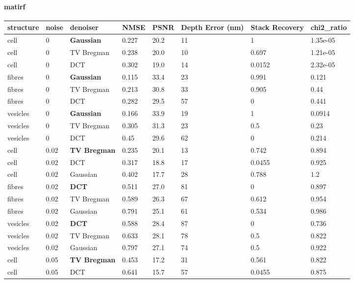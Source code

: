 \paragraph{matirf}
\begin{center}\begin{adjustbox}{max width=\linewidth}
\begin{tabular}{llllllll}
\toprule
structure & noise & denoiser & NMSE & PSNR & Depth Error (nm) & Stack Recovery & chi2\_ratio \\
\midrule
cell & 0 & \textbf{Gaussian} & 0.227 & 20.2 & 11 & 1 & 1.35e-05 \\
cell & 0 & TV Bregman & 0.238 & 20.0 & 10 & 0.697 & 1.21e-05 \\
cell & 0 & DCT & 0.302 & 19.0 & 14 & 0.0152 & 2.32e-05 \\
fibres & 0 & \textbf{Gaussian} & 0.115 & 33.4 & 23 & 0.991 & 0.121 \\
fibres & 0 & TV Bregman & 0.213 & 30.8 & 33 & 0.905 & 0.44 \\
fibres & 0 & DCT & 0.282 & 29.5 & 57 & 0 & 0.441 \\
vesicles & 0 & \textbf{Gaussian} & 0.166 & 33.9 & 19 & 1 & 0.0914 \\
vesicles & 0 & TV Bregman & 0.305 & 31.3 & 23 & 0.5 & 0.23 \\
vesicles & 0 & DCT & 0.45 & 29.6 & 62 & 0 & 0.214 \\
cell & 0.02 & \textbf{TV Bregman} & 0.235 & 20.1 & 13 & 0.742 & 0.894 \\
cell & 0.02 & DCT & 0.317 & 18.8 & 17 & 0.0455 & 0.925 \\
cell & 0.02 & Gaussian & 0.402 & 17.7 & 28 & 0.788 & 1.2 \\
fibres & 0.02 & \textbf{DCT} & 0.511 & 27.0 & 81 & 0 & 0.897 \\
fibres & 0.02 & TV Bregman & 0.589 & 26.3 & 67 & 0.612 & 0.954 \\
fibres & 0.02 & Gaussian & 0.791 & 25.1 & 61 & 0.534 & 0.986 \\
vesicles & 0.02 & \textbf{DCT} & 0.588 & 28.4 & 87 & 0 & 0.736 \\
vesicles & 0.02 & TV Bregman & 0.633 & 28.1 & 78 & 0.5 & 0.822 \\
vesicles & 0.02 & Gaussian & 0.797 & 27.1 & 74 & 0.5 & 0.922 \\
cell & 0.05 & \textbf{TV Bregman} & 0.453 & 17.2 & 31 & 0.561 & 0.822 \\
cell & 0.05 & DCT & 0.641 & 15.7 & 57 & 0.0455 & 0.875 \\

\end{tabular}
\end{adjustbox}
\end{center}
